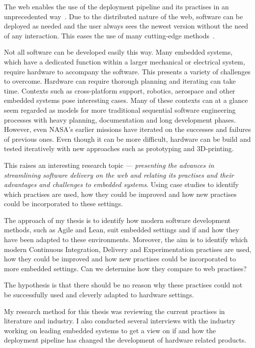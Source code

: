 \documentclass[english]{tktltiki2}
\begin{document}
The web enables the use of the deployment pipeline and its practises in an unprecedented way~\cite{KLS09}. Due to the distributed nature of the web, software can be deployed as needed and the user always sees the newest version without the need of any interaction. This eases the use of many cutting-edge methods~\cite{KLS09}.

Not all software can be developed easily this way. Many embedded systems, which have a dedicated function within a larger mechanical or electrical system, require hardware to accompany the software. This presents a variety of challenges to overcome. Hardware can require thorough planning and iterating can take time. Contexts such as cross-platform support, robotics, aerospace and other embedded systems pose interesting cases. Many of these contexts can at a glance seem regarded as models for more traditional sequential software engineering processes with heavy planning, documentation and long development phases. However, even NASA’s earlier missions have iterated on the successes and failures of previous ones. Even though it can be more difficult, hardware can be build and tested iteratively with new approaches such as prototyping and 3D-printing.

This raises an interesting research topic — \emph{presenting the advances in streamlining software delivery on the web and relating its practises and their advantages and challenges to embedded systems}. Using case studies to identify which practises are used, how they could be improved and how new practises could be incorporated to these settings.

The approach of my thesis is to identify how modern software development methods, such as Agile and Lean, suit embedded settings and if and how they have been adapted to these environments. Moreover, the aim is to identify which modern Continuous Integration, Delivery and Experimentation practises are used, how they could be improved and how new practises could be incorporated to more embedded settings. Can we determine how they compare to web practises?

The hypothesis is that there should be no reason why these practises could not be successfully used and cleverly adapted to hardware settings.

My research method for this thesis was reviewing the current practises in literature and industry. I also conducted several interviews with the industry working on leading embedded systems to get a view on if and how the deployment pipeline has changed the development of hardware related products.
\end{document}
